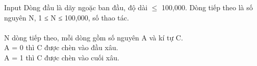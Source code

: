 Input
Dòng đầu là dãy ngoặc ban đầu, độ dài  $\le$  100,000. Dòng tiếp theo là số nguyên N, 1 ≤ N ≤ 100,000, số thao tác.
\\
\\N dòng tiếp theo, mỗi dòng gồm số nguyên A và kí tự C.
\\A = 0 thì C được chèn vào đầu xâu.
\\A = 1 thì C được chèn vào cuối xâu.